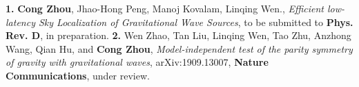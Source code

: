 
\begin{cventries}
\vspace{-0.45cm}
  \cventry
    {}
    {}
    {}
    {}
    {\textbf{1.} \textnormal{\textbf{Cong Zhou}, Jhao-Hong Peng, Manoj Kovalam, Linqing Wen., \textsl{Efficient low-latency Sky Localization of Gravitational Wave Sources}, to be submitted to \textbf{Phys. Rev. D}, in preparation.}}
  \vspace{-0.2cm}
  \cventry
  {}
  {}
  {}
  {}
  {\textbf{2.} \textnormal{Wen Zhao, Tan Liu, Linqing Wen, Tao Zhu, Anzhong Wang, Qian Hu, and \textbf{Cong Zhou},  \textsl{Model-independent test of the parity symmetry of gravity with gravitational waves}, \textnormal{arXiv:1909.13007,} \textbf{ Nature Communications}, under review.}}
\vspace{-0.35cm}
\end{cventries}